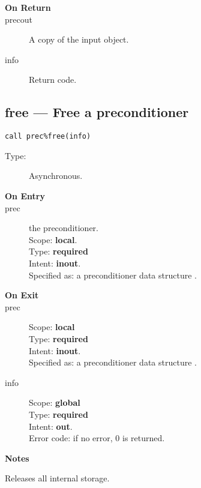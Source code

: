 \begin{description}
\item[\bf On Return]
\item[precout] A copy of the input object.
\item[info] Return code. 
\end{description}


\clearpage\subsection{free --- Free a  preconditioner}

\begin{verbatim}
call prec%free(info)
\end{verbatim}

\begin{description}
\item[Type:] Asynchronous.
\item[\bf On Entry]
\item[prec] the preconditioner.\\
Scope: {\bf local}.\\
Type: {\bf required}\\
Intent: {\bf inout}.\\
Specified as: a preconditioner data structure \precdata.
\item[\bf On Exit]

\item[prec] 
Scope: {\bf local} \\
Type: {\bf required}\\
Intent: {\bf inout}.\\
Specified as: a preconditioner data structure \precdata.
\item[info] 
Scope: {\bf global} \\
Type: {\bf required}\\
Intent: {\bf out}.\\
Error code: if no error, 0 is returned.
\end{description}
{\par\noindent\large\bfseries Notes}
Releases all internal storage.

